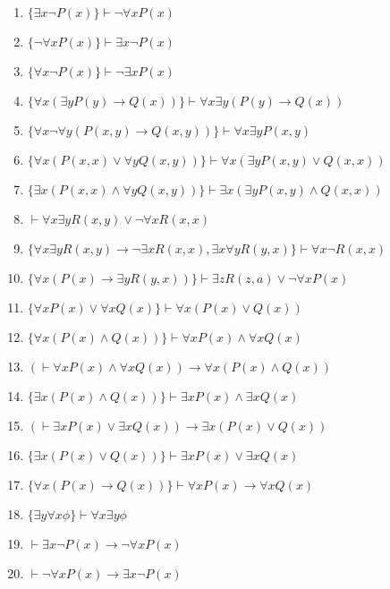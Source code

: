 \begin{enumerate}
    \item \(\{\exists x \neg P(x)\} \vdash \neg \forall x P(x)\)
    \item \(\{\neg \forall x P(x)\} \vdash \exists x \neg P(x)\)
    \item \(\{\forall x \neg P(x)\} \vdash \neg \exists x P(x)\)
    \item \(\{\forall x (\exists y P(y) \rightarrow Q(x))\} \vdash \forall x \exists y (P(y) \rightarrow Q(x))\)
    \item \(\{\forall x \neg \forall y (P(x,y) \rightarrow Q(x,y))\} \vdash \forall x \exists y P(x,y)\)
    \item \(\{\forall x (P(x,x) \vee \forall y Q(x,y))\} \vdash \forall x (\exists y P(x,y) \vee Q(x,x))\)
    \item \(\{\exists x (P(x,x) \wedge \forall y Q(x,y))\} \vdash \exists x (\exists y P(x,y) \wedge Q(x,x))\)
    \item \(\vdash \forall x \exists y R(x,y) \vee \neg \forall x R(x,x)\)
    \item \(\{\forall x \exists y R(x,y) \rightarrow \neg \exists x R(x,x), \exists x \forall y R(y,x)\} \vdash \forall x \neg R(x,x)\)
    \item \(\{\forall x (P(x) \rightarrow \exists y R(y,x))\} \vdash \exists z R(z,a) \vee \neg \forall x P(x)\)
    \item \(\{\forall x P(x) \vee \forall x Q(x)\} \vdash \forall x (P(x) \vee Q(x))\)
    \item \(\{\forall x (P(x) \wedge Q(x))\} \vdash \forall x P(x) \wedge \forall x Q(x)\)
    \item \((\vdash \forall x P(x) \wedge \forall x Q(x)) \rightarrow \forall x (P(x) \wedge Q(x))\)
    \item \(\{\exists x (P(x) \wedge Q(x))\} \vdash \exists x P(x) \wedge \exists x Q(x)\)
    \item \((\vdash \exists x P(x) \vee \exists x Q(x)) \rightarrow \exists x (P(x) \vee Q(x))\)
    \item \(\{\exists x (P(x) \vee Q(x))\} \vdash \exists x P(x) \vee \exists x Q(x)\)
    \item \(\{\forall x (P(x) \rightarrow Q(x))\} \vdash \forall x P(x) \rightarrow \forall x Q(x)\)
    \item \(\{\exists y \forall x \phi\} \vdash \forall x \exists y \phi\)
    \item \(\vdash \exists x \neg P(x) \rightarrow \neg \forall x P(x)\)
    \item \(\vdash \neg \forall x P(x) \rightarrow \exists x \neg P(x)\)

\end{enumerate}
